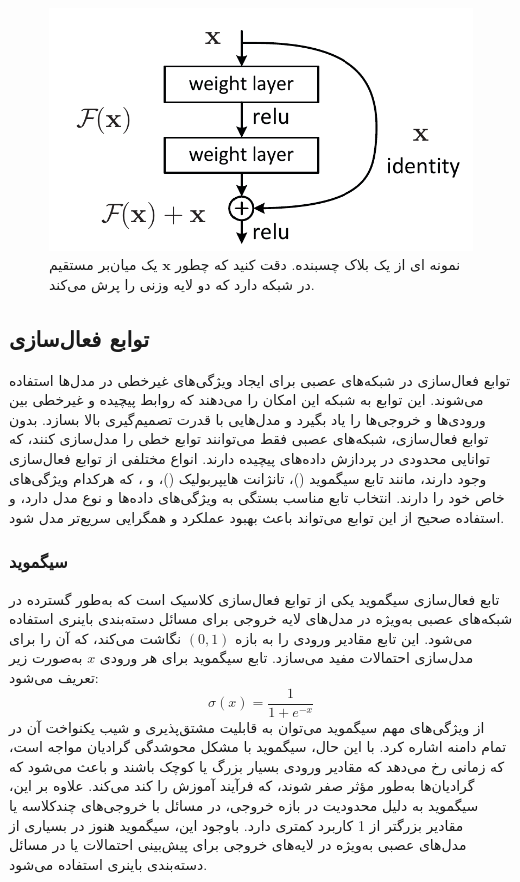 \begin{figure}
	\centering
	\includegraphics[width=0.7\linewidth]{resb1}
	\caption{نمونه ای از یک بلاک چسبنده. دقت کنید که چطور $\mathbf{x}$ یک میان‌بر مستقیم در شبکه دارد که دو لایه وزنی را پرش می‌کند.}
	\label{fig:resb1}
\end{figure}


\subsection{توابع فعال‌سازی}
توابع فعال‌سازی%
در شبکه‌های عصبی برای ایجاد ویژگی‌های غیرخطی در مدل‌ها استفاده می‌شوند. این توابع به شبکه این امکان را می‌دهند که روابط پیچیده و غیرخطی بین ورودی‌ها و خروجی‌ها را یاد بگیرد و مدل‌هایی با قدرت تصمیم‌گیری بالا بسازد. بدون توابع فعال‌سازی، شبکه‌های عصبی فقط می‌توانند توابع خطی را مدل‌سازی کنند، که توانایی محدودی در پردازش داده‌های پیچیده دارند. انواع مختلفی از توابع فعال‌سازی وجود دارند، مانند تابع سیگموید ()، تانژانت هایپربولیک ()،  و ، که هرکدام ویژگی‌های خاص خود را دارند. انتخاب تابع مناسب بستگی به ویژگی‌های داده‌ها و نوع مدل دارد، و استفاده صحیح از این توابع می‌تواند باعث بهبود عملکرد و همگرایی سریع‌تر مدل شود.


\subsubsection{سیگموید}
تابع فعال‌سازی سیگموید%
یکی از توابع فعال‌سازی کلاسیک است که به‌طور گسترده در شبکه‌های عصبی به‌ویژه در مدل‌های لایه خروجی برای مسائل دسته‌بندی باینری استفاده می‌شود. این تابع مقادیر ورودی را به بازه $(0, 1)$ نگاشت می‌کند، که آن را برای مدل‌سازی احتمالات مفید می‌سازد. تابع سیگموید برای هر ورودی $x$ به‌صورت زیر تعریف می‌شود:
$$
\sigma(x) = \frac{1}{1 + e^{-x}}
$$
از ویژگی‌های مهم سیگموید می‌توان به قابلیت مشتق‌پذیری و شیب یکنواخت آن در تمام دامنه اشاره کرد. با این حال، سیگموید با مشکل محوشدگی گرادیان مواجه است، که زمانی رخ می‌دهد که مقادیر ورودی بسیار بزرگ یا کوچک باشند و باعث می‌شود که گرادیان‌ها به‌طور مؤثر صفر شوند، که فرآیند آموزش را کند می‌کند. علاوه بر این، سیگموید به دلیل محدودیت در بازه خروجی، در مسائل با خروجی‌های چندکلاسه یا مقادیر بزرگتر از 1 کاربرد کمتری دارد. باوجود این، سیگموید هنوز در بسیاری از مدل‌های عصبی به‌ویژه در لایه‌های خروجی برای پیش‌بینی احتمالات یا در مسائل دسته‌بندی باینری استفاده می‌شود.

